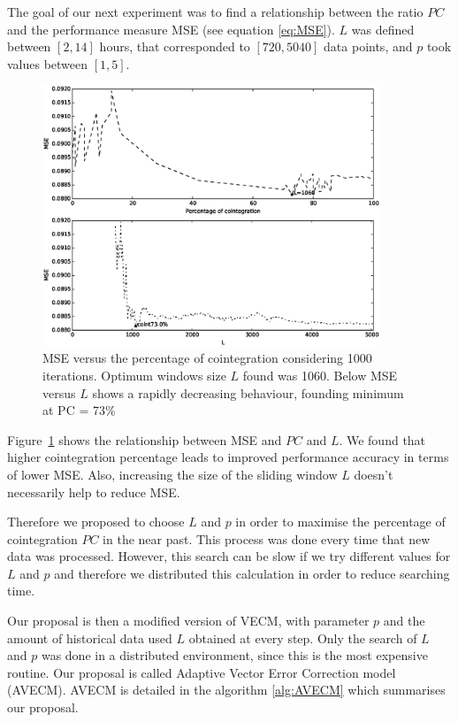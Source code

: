 The goal of our next experiment was to find a relationship between the ratio $PC$
and the performance measure MSE (see equation \ref{eq:MSE}). $L$ was defined
between $[2,14]$ hours, that corresponded to $[720, 5040]$ data points, and $p$
took values between $[1,5]$.  

\begin{figure}[ht!]
  \centering
   \includegraphics[width=0.9\textwidth]{img/51_Fig2}
  \caption{MSE versus the percentage of cointegration considering 1000
  iterations. Optimum windows size $L$ found was 1060. Below MSE versus $L$ shows a
  rapidly decreasing behaviour, founding minimum at PC = 73\% }
  \label{fig:cointvsmse}
\end{figure}

Figure~\ref{fig:cointvsmse} shows the relationship between MSE and $PC$ and $L$. We
found that higher cointegration percentage leads to improved performance accuracy
in terms of lower MSE. Also, increasing the size of the sliding window $L$
doesn't necessarily help to reduce MSE.

Therefore we proposed to choose $L$ and $p$ in order to maximise the percentage
of cointegration $PC$ in the near past. This process was done every time that
new data was processed. However, this search can be slow if we try different
values for $L$ and $p$ and therefore we distributed this calculation in order to
reduce searching time.

Our proposal is then a modified version of VECM, with parameter $p$ and the
amount of historical data used $L$ obtained at every step. Only the search of
$L$ and $p$ was done in a distributed environment, since this is the most
expensive routine. Our proposal is called Adaptive Vector Error Correction model
(AVECM). AVECM is detailed in the algorithm \ref{alg:AVECM} which summarises
our proposal.

